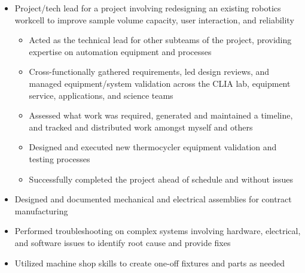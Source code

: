 {\begin{itemize}
        \begin{itemize}%
            \item Took on app and instrument driver work from the software team when necessary
            \item General scripting with Python
        \end{itemize}%
        \item Project/tech lead for a project involving redesigning an existing robotics workcell to improve sample volume capacity, user interaction, and reliability
        \begin{itemize}%
            \item Acted as the technical lead for other subteams of the project, providing expertise on automation equipment and processes
            \item Cross-functionally gathered requirements, led design reviews, and managed equipment/system validation across the CLIA lab, equipment service, applications, and science teams
            \item Assessed what work was required, generated and maintained a timeline, and tracked and distributed work amongst myself and others
            \item Designed and executed new thermocycler equipment validation and testing processes
            \item Successfully completed the project ahead of schedule and without issues
        \end{itemize}%
        \item Designed and documented mechanical and electrical assemblies for contract manufacturing
        \item Performed troubleshooting on complex systems involving hardware, electrical, and software issues to identify root cause and provide fixes
        \item Utilized machine shop skills to create one-off fixtures and parts as needed
    \end{itemize}
}
\divLine
{}
